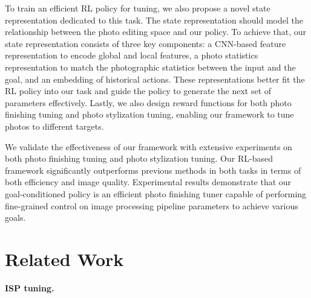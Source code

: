 \documentclass{article}
\newcommand{\pipeline}{image processing pipeline\xspace}
\newcommand{\taskPFT}{photo finishing tuning\xspace}
\newcommand{\taskPST}{photo stylization tuning\xspace}
\begin{document}
To train an efficient RL policy for tuning, we also propose a novel state representation dedicated to this task. The state representation should model the relationship between the photo editing space and our policy. To achieve that, our state representation consists of three key components: a CNN-based feature representation to encode global and local features, a photo statistics representation to match the photographic statistics between the input and the goal, and an embedding of historical actions. These representations better fit the RL policy into our task and guide the policy to generate the next set of parameters effectively. Lastly, we also design reward functions for both \taskPFT and \taskPST, enabling our framework to tune photos to different targets.

We validate the effectiveness of our framework with extensive experiments on both \taskPFT and \taskPST. Our RL-based framework significantly outperforms previous methods in both tasks in terms of both efficiency and image quality. Experimental results demonstrate that our goal-conditioned policy is an efficient photo finishing tuner capable of performing fine-grained control on \pipeline parameters to achieve various goals.




\section{Related Work}
\vspace{-5pt}
\noindent\textbf{ISP tuning.}
\end{document}
